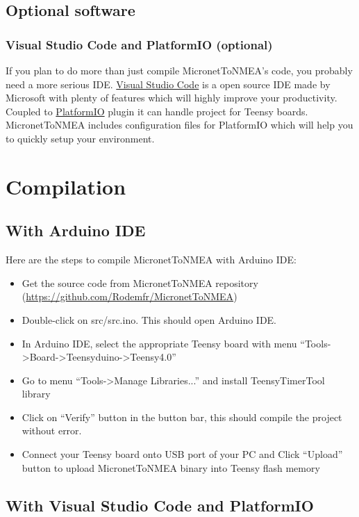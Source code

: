 \documentclass{report}
\begin{document}
\section{Optional software}

\subsection{Visual Studio Code and PlatformIO (optional)}

If you plan to do more than just compile MicronetToNMEA’s code, you probably need a more serious IDE. \href{https://code.visualstudio.com/}{Visual Studio Code} is a open source IDE made by Microsoft with plenty of features which will highly improve your productivity. Coupled to \href{https://platformio.org/}{PlatformIO} plugin it can handle project for Teensy boards. MicronetToNMEA includes configuration files for PlatformIO which will help you to quickly setup your environment.

\chapter{Compilation}

\section{With Arduino IDE}

Here are the steps to compile MicronetToNMEA with Arduino IDE:

\begin{itemize}
\item Get the source code from MicronetToNMEA repository (\url{https://github.com/Rodemfr/MicronetToNMEA})
\item Double-click on src/src.ino. This should open Arduino IDE.
\item In Arduino IDE, select the appropriate Teensy board with menu “Tools->Board->Teensyduino->Teensy4.0”
\item Go to menu “Tools->Manage Libraries...” and install TeensyTimerTool library
\item Click on “Verify” button in the button bar, this should compile the project without error.
\item Connect your Teensy board onto USB port of your PC and Click “Upload” button to upload MicronetToNMEA binary into Teensy flash memory
\end{itemize}

\section{With Visual Studio Code and PlatformIO}
\end{document}

